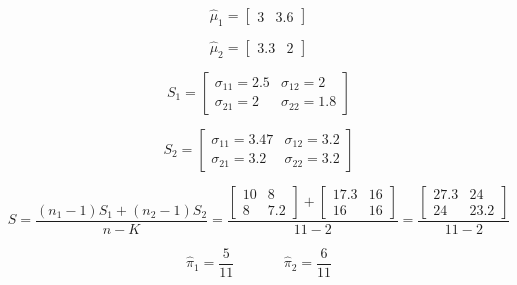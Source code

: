 \documentclass[12pt,a4paper]{article}%
\theoremstyle{definition}
\theoremstyle{plain}
\numberwithin{equation}{section}
\begin{document}
\begin{oframed}
\begin{multicols}{2}
\begin{equation*}
\hat{\mu}_{1} = \left[ \begin{array}{cc}
3 & 3.6
\end{array} \right]
\end{equation*}

\columnbreak

\vspace{-10pt}

\begin{equation*}
\hat{\mu}_{2} = \left[ \begin{array}{cc}
3.3 & 2
\end{array} \right]
\end{equation*}
\end{multicols}

\begin{multicols}{2}
\begin{equation*}
S_{1} = \left[ \begin{array}{cc}
 \sigma_{11}=2.5 & \sigma_{12}=2 \\
 \sigma_{21}=2   & \sigma_{22}=1.8
\end{array} \right]
\end{equation*}

\columnbreak

\begin{equation*}
S_{2} = \left[ \begin{array}{cc}
 \sigma_{11}=3.47 &  \sigma_{12}=3.2 \\
 \sigma_{21}=3.2 &  \sigma_{22}=3.2
\end{array} \right]
\end{equation*}
\end{multicols}

\begin{equation*}
S = \frac{(n_{1}-1)S_{1} + (n_{2}-1)S_{2}}{n-K} = \frac{
\left[ \begin{array}{cc}
 10 &  8 \\
 8 &  7.2
\end{array} \right] + \left[\begin{array}{cc}
 17.3 & 16 \\
 16  & 16
\end{array} \right]}{11-2} = 
\frac{
\left[\begin{array}{cc}
 27.3 & 24 \\
 24  & 23.2
\end{array} \right]}{11-2}
\end{equation*}

\begin{equation*}
\hat{\pi}_{1} = \frac{5}{11} ~~~~~~~~~~~~~~~~ \hat{\pi}_{2} = \frac{6}{11}
\end{equation*}


\end{oframed}
\end{document}
